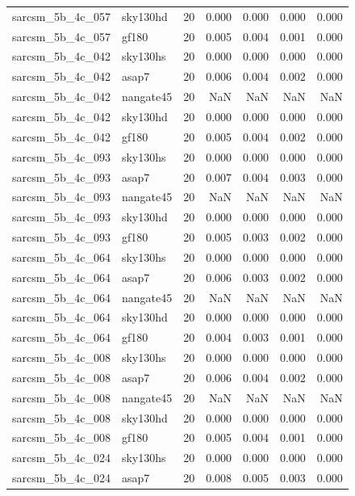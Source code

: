 \begin{tabular}{llrrrrr}
sarcsm\_5b\_4c\_057 & sky130hd & 20 & 0.000 & 0.000 & 0.000 & 0.000 \\
sarcsm\_5b\_4c\_057 & gf180 & 20 & 0.005 & 0.004 & 0.001 & 0.000 \\
sarcsm\_5b\_4c\_042 & sky130hs & 20 & 0.000 & 0.000 & 0.000 & 0.000 \\
sarcsm\_5b\_4c\_042 & asap7 & 20 & 0.006 & 0.004 & 0.002 & 0.000 \\
sarcsm\_5b\_4c\_042 & nangate45 & 20 & NaN & NaN & NaN & NaN \\
sarcsm\_5b\_4c\_042 & sky130hd & 20 & 0.000 & 0.000 & 0.000 & 0.000 \\
sarcsm\_5b\_4c\_042 & gf180 & 20 & 0.005 & 0.004 & 0.002 & 0.000 \\
sarcsm\_5b\_4c\_093 & sky130hs & 20 & 0.000 & 0.000 & 0.000 & 0.000 \\
sarcsm\_5b\_4c\_093 & asap7 & 20 & 0.007 & 0.004 & 0.003 & 0.000 \\
sarcsm\_5b\_4c\_093 & nangate45 & 20 & NaN & NaN & NaN & NaN \\
sarcsm\_5b\_4c\_093 & sky130hd & 20 & 0.000 & 0.000 & 0.000 & 0.000 \\
sarcsm\_5b\_4c\_093 & gf180 & 20 & 0.005 & 0.003 & 0.002 & 0.000 \\
sarcsm\_5b\_4c\_064 & sky130hs & 20 & 0.000 & 0.000 & 0.000 & 0.000 \\
sarcsm\_5b\_4c\_064 & asap7 & 20 & 0.006 & 0.003 & 0.002 & 0.000 \\
sarcsm\_5b\_4c\_064 & nangate45 & 20 & NaN & NaN & NaN & NaN \\
sarcsm\_5b\_4c\_064 & sky130hd & 20 & 0.000 & 0.000 & 0.000 & 0.000 \\
sarcsm\_5b\_4c\_064 & gf180 & 20 & 0.004 & 0.003 & 0.001 & 0.000 \\
sarcsm\_5b\_4c\_008 & sky130hs & 20 & 0.000 & 0.000 & 0.000 & 0.000 \\
sarcsm\_5b\_4c\_008 & asap7 & 20 & 0.006 & 0.004 & 0.002 & 0.000 \\
sarcsm\_5b\_4c\_008 & nangate45 & 20 & NaN & NaN & NaN & NaN \\
sarcsm\_5b\_4c\_008 & sky130hd & 20 & 0.000 & 0.000 & 0.000 & 0.000 \\
sarcsm\_5b\_4c\_008 & gf180 & 20 & 0.005 & 0.004 & 0.001 & 0.000 \\
sarcsm\_5b\_4c\_024 & sky130hs & 20 & 0.000 & 0.000 & 0.000 & 0.000 \\
sarcsm\_5b\_4c\_024 & asap7 & 20 & 0.008 & 0.005 & 0.003 & 0.000 \\

\end{tabular}
